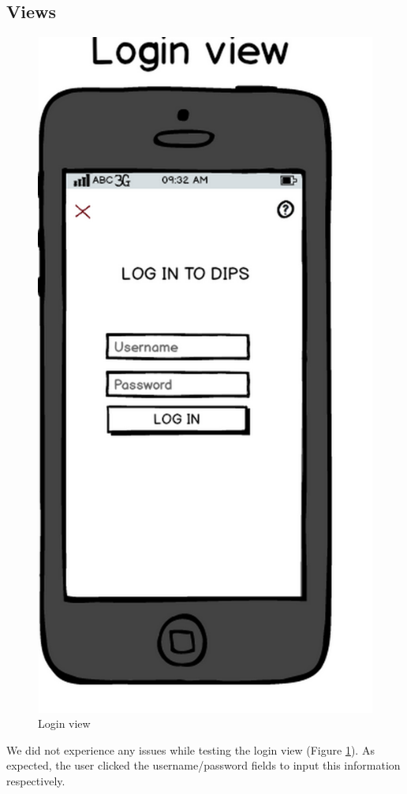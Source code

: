 \subsection{Views}

\begin{figure}[H]
\centering
\includegraphics[scale=0.20]{img/mockups/login_view.png}
\caption{Login view}
\label{loginmock}
\end{figure}
We did not experience any issues while testing the login view (Figure \ref{loginmock}). As expected, the user clicked the username/password fields to input this information respectively. 


